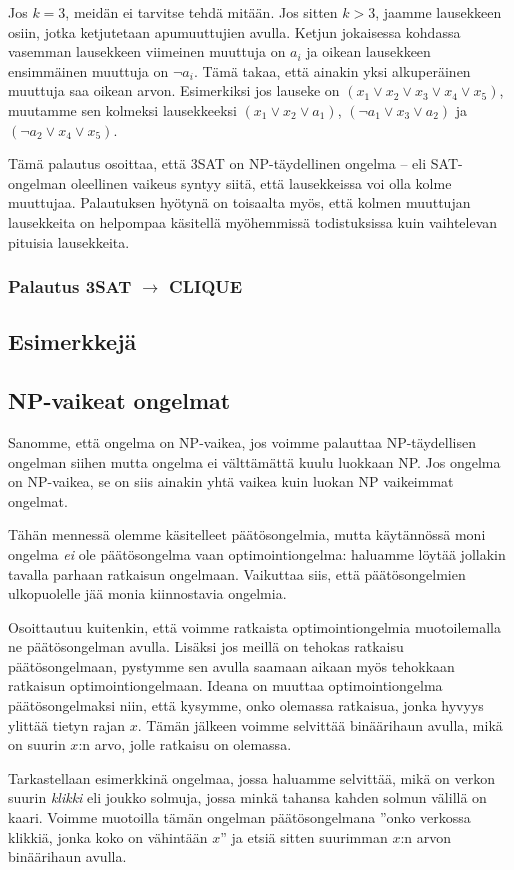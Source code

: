 Jos $k=3$, meidän ei tarvitse tehdä mitään. Jos sitten $k>3$,
jaamme lausekkeen osiin, jotka ketjutetaan apumuuttujien avulla.
Ketjun jokaisessa kohdassa vasemman lausekkeen viimeinen
muuttuja on $a_i$ ja oikean lausekkeen ensimmäinen muuttuja on $\neg a_i$.
Tämä takaa, että ainakin yksi alkuperäinen muuttuja saa oikean arvon.
Esimerkiksi jos lauseke on $(x_1 \lor x_2 \lor x_3 \lor x_4 \lor x_5)$,
muutamme sen kolmeksi lausekkeeksi $(x_1 \lor x_2 \lor a_1)$,
$(\neg a_1 \lor x_3 \lor a_2)$ ja $(\neg a_2 \lor x_4 \lor x_5)$.

Tämä palautus osoittaa, että 3SAT on NP-täydellinen ongelma --
eli SAT-ongelman oleellinen vaikeus syntyy siitä, että lausekkeissa
voi olla kolme muuttujaa.
Palautuksen hyötynä on toisaalta myös, että kolmen muuttujan lausekkeita
on helpompaa käsitellä myöhemmissä todistuksissa
kuin vaihtelevan pituisia lausekkeita.

\subsubsection{Palautus 3SAT $\rightarrow$ CLIQUE}

\subsection{Esimerkkejä}

\subsection{NP-vaikeat ongelmat}

Sanomme, että ongelma on NP-vaikea, jos voimme palauttaa
NP-täydellisen ongelman siihen mutta ongelma ei välttämättä
kuulu luokkaan NP.
Jos ongelma on NP-vaikea, se on siis ainakin yhtä vaikea
kuin luokan NP vaikeimmat ongelmat.

Tähän mennessä olemme käsitelleet päätösongelmia,
mutta käytännössä moni ongelma \emph{ei} ole päätösongelma
vaan optimointiongelma: haluamme löytää jollakin
tavalla parhaan ratkaisun ongelmaan.
Vaikuttaa siis, että päätöson\-gelmien ulkopuolelle jää
monia kiinnostavia ongelmia.

Osoittautuu kuitenkin, että voimme ratkaista optimointiongelmia
muotoilemalla ne päätösongelman avulla.
Lisäksi jos meillä on tehokas ratkaisu päätösongelmaan,
pystymme sen avulla saamaan aikaan myös tehokkaan
ratkaisun optimointiongelmaan.
Ideana on muuttaa optimointiongelma päätös\-ongelmaksi niin,
että kysymme, onko olemassa ratkaisua, jonka hyvyys ylittää
tietyn rajan $x$. Tämän jälkeen voimme selvittää binäärihaun
avulla, mikä on suurin $x$:n arvo, jolle ratkaisu on olemassa.

Tarkastellaan esimerkkinä ongelmaa, jossa haluamme selvittää,
mikä on verkon suurin \emph{klikki} eli joukko solmuja,
jossa minkä tahansa kahden solmun välillä on kaari.
Voimme muotoilla tämän ongelman päätösongelmana
''onko verkossa klikkiä, jonka koko on vähintään $x$''
ja etsiä sitten suurimman $x$:n arvon binäärihaun avulla.